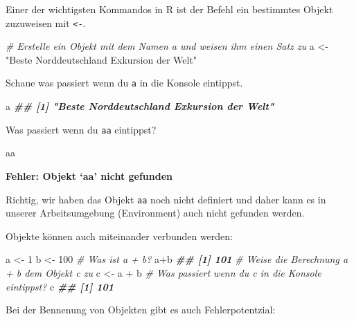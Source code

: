 \documentclass[
]{article}
\newenvironment{Shaded}{\begin{snugshade}}{\end{snugshade}}
\newcommand{\CommentTok}[1]{\textcolor[rgb]{0.56,0.35,0.01}{\textit{#1}}}
\newcommand{\DecValTok}[1]{\textcolor[rgb]{0.00,0.00,0.81}{#1}}
\newcommand{\DocumentationTok}[1]{\textcolor[rgb]{0.56,0.35,0.01}{\textbf{\textit{#1}}}}
\newcommand{\NormalTok}[1]{#1}
\newcommand{\OtherTok}[1]{\textcolor[rgb]{0.56,0.35,0.01}{#1}}
\newcommand{\SpecialCharTok}[1]{\textcolor[rgb]{0.00,0.00,0.00}{#1}}
\newcommand{\StringTok}[1]{\textcolor[rgb]{0.31,0.60,0.02}{#1}}
\begin{document}
Einer der wichtigsten Kommandos in R ist der Befehl ein bestimmtes Objekt zuzuweisen mit \texttt{\textless{}-}.

\begin{Shaded}
\begin{Highlighting}[]
\CommentTok{\# Erstelle ein Objekt mit dem Namen a und weisen ihm einen Satz zu}
\NormalTok{a }\OtherTok{\textless{}{-}} \StringTok{"Beste Norddeutschland Exkursion der Welt"}
\end{Highlighting}
\end{Shaded}

Schaue was passiert wenn du \texttt{a} in die Konsole eintippst.

\begin{Shaded}
\begin{Highlighting}[]
\NormalTok{a}
\DocumentationTok{\#\# [1] "Beste Norddeutschland Exkursion der Welt"}
\end{Highlighting}
\end{Shaded}

Was passiert wenn du \texttt{aa} eintippst?

\begin{Shaded}
\begin{Highlighting}[]
\NormalTok{aa}
\end{Highlighting}
\end{Shaded}

\textbf{Fehler: Objekt `aa' nicht gefunden}

Richtig, wir haben das Objekt \texttt{aa} noch nicht definiert und daher kann es in unserer Arbeitsumgebung (Environment) auch nicht gefunden werden.

Objekte können auch miteinander verbunden werden:

\begin{Shaded}
\begin{Highlighting}[]
\NormalTok{a }\OtherTok{\textless{}{-}} \DecValTok{1}
\NormalTok{b }\OtherTok{\textless{}{-}} \DecValTok{100}
\CommentTok{\# Was ist a + b?}
\NormalTok{a}\SpecialCharTok{+}\NormalTok{b}
\DocumentationTok{\#\# [1] 101}
\CommentTok{\# Weise die Berechnung a + b dem Objekt c zu }
\NormalTok{c }\OtherTok{\textless{}{-}}\NormalTok{ a }\SpecialCharTok{+}\NormalTok{ b}
\CommentTok{\# Was passiert wenn du c in die Konsole eintippst?}
\NormalTok{c}
\DocumentationTok{\#\# [1] 101}
\end{Highlighting}
\end{Shaded}

Bei der Bennenung von Objekten gibt es auch Fehlerpotentzial:
\end{document}
